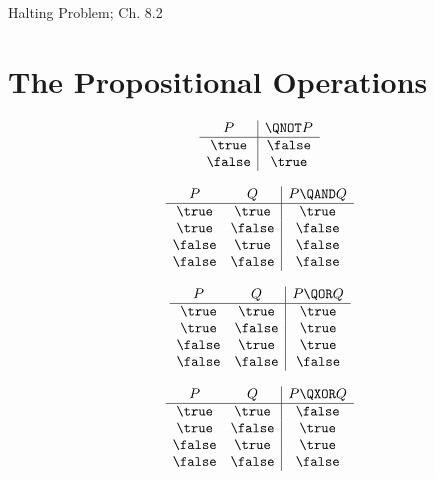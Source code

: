\documentclass[handout]{mcs}
\begin{document}

\begin{staffnotes}
	Halting Problem;  Ch. 8.2
\end{staffnotes}




\iffalse

\instatements{\newpage}
\section*{The Propositional Operations}

\[
\begin{array}{c|c}
P & \QNOT P \\ \hline
\true & \false \\
\false & \true \\
\end{array}
\]

\[
\begin{array}{cc|c}
P & Q & P \QAND Q \\ \hline
\true & \true & \true \\
\true & \false & \false \\
\false & \true & \false \\
\false & \false & \false
\end{array}
\]


\[
\begin{array}{cc|c}
P & Q & P \QOR Q \\ \hline
\true & \true & \true \\
\true & \false & \true \\
\false & \true & \true \\
\false & \false & \false
\end{array}
\]

\[
\begin{array}{cc|c}
P & Q & P \QXOR Q \\ \hline
\true & \true & \false \\
\true & \false & \true \\
\false & \true & \true \\
\false & \false & \false
\end{array}
\]
\end{document}
